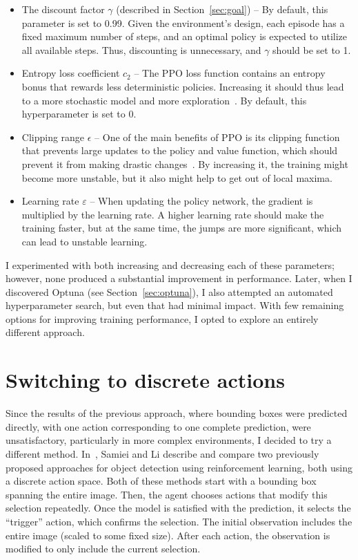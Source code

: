 \documentclass[
  digital,     %
  oneside,     %
  nosansbold,  %
  nocolorbold, %
  lof,         %
  lot,         %
]{fithesis4}
\begin{document}
\begin{itemize}
    \item The discount factor $\gamma$ (described in Section~\ref{sec:goal}) -- By default, this parameter is set to 0.99. Given the environment’s design, each episode has a fixed maximum number of steps, and an optimal policy is expected to utilize all available steps. Thus, discounting is unnecessary, and $\gamma$ should be set to 1.
    \item Entropy loss coefficient $c_2$ -- The PPO loss function contains an entropy bonus that rewards less deterministic policies. Increasing it should thus lead to a more stochastic model and more exploration~\cite{PPO_paper}. By default, this hyperparameter is set to 0.
    \item Clipping range $\epsilon$ -- One of the main benefits of PPO is its clipping function that prevents large updates to the policy and value function, which should prevent it from making drastic changes~\cite{PPO_paper}. By increasing it, the training might become more unstable, but it also might help to get out of local maxima.
    \item Learning rate $\varepsilon$ -- When updating the policy network, the gradient is multiplied by the learning rate. A higher learning rate should make the training faster, but at the same time, the jumps are more significant, which can lead to unstable learning.
\end{itemize}

I experimented with both increasing and decreasing each of these parameters; however, none produced a substantial improvement in performance. Later, when I discovered Optuna (see Section~\ref{sec:optuna}), I also attempted an automated hyperparameter search, but even that had minimal impact. With few remaining options for improving training performance, I opted to explore an entirely different approach.

\section{Switching to discrete actions}
\label{sec:iterative}

Since the results of the previous approach, where bounding boxes were predicted directly, with one action corresponding to one complete prediction, were unsatisfactory, particularly in more complex environments, I decided to try a different method. In~\cite{rl_object_detection}, Samiei and Li describe and compare two previously proposed approaches for object detection using reinforcement learning, both using a discrete action space. Both of these methods start with a bounding box spanning the entire image. Then, the agent chooses actions that modify this selection repeatedly. Once the model is satisfied with the prediction, it selects the \enquote{trigger} action, which confirms the selection. The initial observation includes the entire image (scaled to some fixed size). After each action, the observation is modified to only include the current selection.
\end{document}
